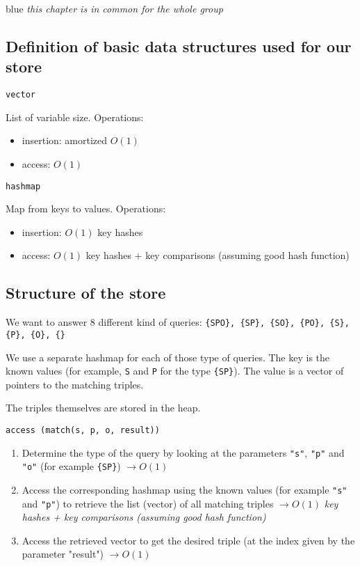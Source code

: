 \begin{mybox}{blue}
\emph{this chapter is in common for the whole group}
\end{mybox}

\subsection{Definition of basic data structures used for our store}

\begin{tcolorbox}
\verb!vector!
\end{tcolorbox}

List of variable size. Operations:
\begin{itemize}
    \item
    insertion: amortized $O(1)$
    \item
    access: $O(1)$
\end{itemize}


\bigskip
\begin{tcolorbox}
\verb!hashmap!
\end{tcolorbox}

Map from keys to values. Operations:
\begin{itemize}
    \item
    insertion: $O(1)$ key hashes
    \item
    access: $O(1)$ key hashes + key comparisons (assuming good hash function)
\end{itemize}



\pagebreak
\subsection{Structure of the store}
We want to answer 8 different kind of queries: \verb!{SPO}, {SP}, {SO}, {PO}, {S}, {P}, {O}, {}!

We use a separate hashmap for each of those type of queries. The key is the known values (for example, \verb!S! and \verb!P! for the type \verb!{SP}!). The value is a vector of pointers to the matching triples.

The triples themselves are stored in the heap.

\bigskip
\begin{tcolorbox}
\verb!access (match(s, p, o, result))!
\end{tcolorbox}

\begin{enumerate}
    \item
    Determine the type of the query by looking at the parameters \verb!"s"!, \verb!"p"! and \verb!"o"! (for example \verb!{SP}!) $\rightarrow O(1)$
    \item
    Access the corresponding hashmap using the known values (for example \verb!"s"! and \verb!"p"!) to retrieve the list (vector) of all matching triples $\rightarrow O(1)$ \emph{key hashes + key comparisons (assuming good hash function)}
    \item
    Access the retrieved vector to get the desired triple (at the index given by the parameter "result") $\rightarrow O(1)$
\end{enumerate}

